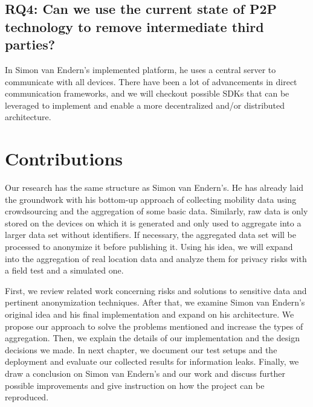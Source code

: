 \subsection*{RQ4: Can we use the current state of P2P technology to remove intermediate third parties?}
In Simon van Endern's implemented platform, he uses a central server to communicate with all devices. There have been a lot of advancements in direct communication frameworks, and we will checkout possible SDKs that can be leveraged to implement and enable a more decentralized and/or distributed architecture.

\section{Contributions}
Our research has the same structure as Simon van Endern's. He has already laid the groundwork with his bottom-up approach of collecting mobility data using crowdsourcing and the aggregation of some basic data. Similarly, raw data is only stored on the devices on which it is generated and only used to aggregate into a larger data set without identifiers. If necessary, the aggregated data set will be processed to anonymize it before publishing it. Using his idea, we will expand into the aggregation of real location data and analyze them for privacy risks with a field test and a simulated one.


First, we review related work concerning risks and solutions to sensitive data and pertinent anonymization techniques. After that, we examine Simon van Endern's original idea and his final implementation and expand on his architecture. We propose our approach to solve the  problems mentioned and increase the types of aggregation. Then, we explain the details of our implementation and the design decisions we made. In next chapter, we document our test setups and the deployment and evaluate our collected results for information leaks. Finally, we draw a conclusion on Simon van Endern's and our work and discuss further possible improvements and give instruction on how the project can be reproduced.
